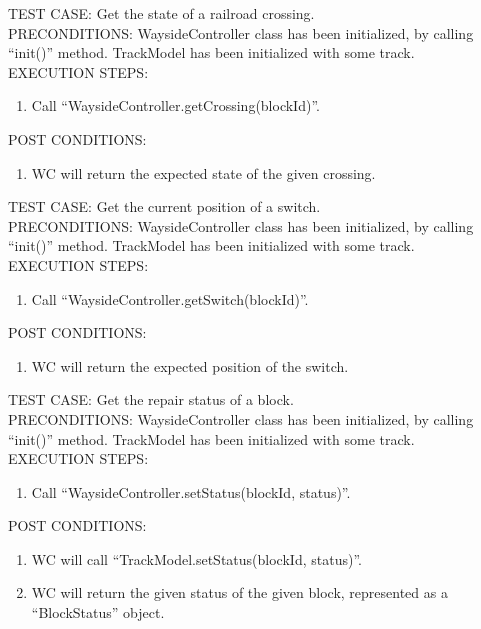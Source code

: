 \documentclass{scrreprt}
\begin{document}
        TEST CASE: Get the state of a railroad crossing.\\
        PRECONDITIONS: WaysideController class has been initialized, by calling ``init()'' method.
        TrackModel has been initialized with some track.\\
        EXECUTION STEPS: \begin{enumerate}
            \item Call ``WaysideController.getCrossing(blockId)''.
        \end{enumerate}
        POST CONDITIONS: \begin{enumerate}
            \item WC will return the expected state of the given crossing.
        \end{enumerate}

        TEST CASE: Get the current position of a switch.\\
        PRECONDITIONS: WaysideController class has been initialized, by calling ``init()'' method.
        TrackModel has been initialized with some track.\\
        EXECUTION STEPS: \begin{enumerate}
            \item Call ``WaysideController.getSwitch(blockId)''.
        \end{enumerate}
        POST CONDITIONS: \begin{enumerate}
            \item WC will return the expected position of the switch.
        \end{enumerate}

        TEST CASE: Get the repair status of a block.\\
        PRECONDITIONS: WaysideController class has been initialized, by calling ``init()'' method.
        TrackModel has been initialized with some track.\\
        EXECUTION STEPS: \begin{enumerate}
            \item Call ``WaysideController.setStatus(blockId, status)''.
        \end{enumerate}
        POST CONDITIONS: \begin{enumerate}
            \item WC will call ``TrackModel.setStatus(blockId, status)''.
            \item WC will return the given status of the given block, represented as a ``BlockStatus'' object.
        \end{enumerate}
\end{document}
